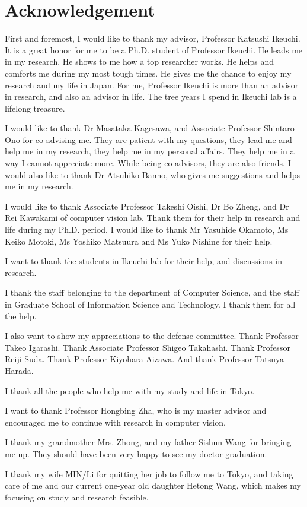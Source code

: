 

\chapter*{Acknowledgement}
%
\thispagestyle{empty}%
First and foremost, I would like to thank my advisor, Professor Katsushi Ikeuchi. It is a great honor for me to be a Ph.D. student of Professor Ikeuchi. He leads me in my research. He shows to me how a top researcher works. He helps and comforts me during my most tough times. He gives me the chance to enjoy my research and my life in Japan. For me, Professor Ikeuchi is more than an advisor in research, and also an advisor in life. The tree years I spend in Ikeuchi lab is a lifelong treasure.

I would like to thank Dr Masataka Kagesawa, and Associate Professor Shintaro Ono for co-advising me. They are patient with my questions, they lead me and help me in my research, they help me in my personal affairs. They help me in a way I cannot appreciate more. While being co-advisors, they are also friends. I would also like to thank Dr Atsuhiko Banno, who gives me suggestions and helps me in my research.

I would like to thank Associate Professor Takeshi Oishi, Dr Bo Zheng, and Dr Rei Kawakami of computer vision lab. Thank them for their help in research and life during my Ph.D. period. I would like to thank Mr Yasuhide Okamoto, Ms Keiko Motoki,  Ms Yoshiko Matsuura and Ms Yuko Nishine for their help.

I want to thank the students in Ikeuchi lab for their help, and discussions in research.

I thank the staff belonging to the department of Computer Science, and the staff in Graduate School of Information Science and Technology. I thank them for all the help.


I also want to show my appreciations to the defense  committee. Thank Professor Takeo Igarashi. Thank Associate Professor Shigeo Takahashi. Thank Professor Reiji Suda. Thank  Professor Kiyohara Aizawa. And thank Professor Tatsuya Harada.

I thank all the people who help me with my study and life in Tokyo.

I want to thank Professor Hongbing Zha, who is my master advisor and encouraged me to continue with research in computer vision.

I thank my grandmother Mrs. Zhong, and my father Sishun Wang for bringing me up. They should have been very happy to see my doctor graduation.

I thank my wife MIN/Li for quitting her job to follow me to Tokyo, and taking care of me and our current one-year old daughter Hetong Wang, which makes my focusing on study and research feasible.
\cleardoublepage
